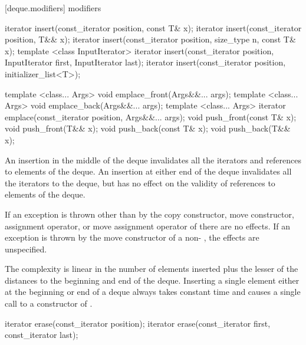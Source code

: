 [deque.modifiers]{ modifiers}

%
%
%
%
\begin{itemdecl}
iterator insert(const_iterator position, const T& x);
iterator insert(const_iterator position, T&& x);
iterator insert(const_iterator position, size_type n, const T& x);
template <class InputIterator>
  iterator insert(const_iterator position,
                  InputIterator first, InputIterator last);
iterator insert(const_iterator position, initializer_list<T>);

template <class... Args> void emplace_front(Args&&... args);
template <class... Args> void emplace_back(Args&&... args);
template <class... Args> iterator emplace(const_iterator position, Args&&... args);
void push_front(const T& x);
void push_front(T&& x);
void push_back(const T& x);
void push_back(T&& x);
\end{itemdecl}

\begin{itemdescr}
\pnum
\effects
An insertion in the middle of the deque invalidates all the iterators and
references to elements of the deque.
An insertion at either end of the
deque invalidates all the iterators to the deque, but has no effect on
the validity of references to elements of the deque.

\pnum
\notes
If an exception is thrown other than by the
copy constructor, move constructor,
assignment operator, or move assignment operator of
there are no effects.
If an exception is thrown by the move constructor of a
non-
, the effects are unspecified.

\pnum
\complexity
The complexity is linear in the number of elements inserted plus the lesser
of the distances to the beginning and end of the deque.
Inserting a single element either at the beginning or end of a deque always takes constant time
and causes a single call to a constructor of
.
\end{itemdescr}

%
\begin{itemdecl}
iterator erase(const_iterator position);
iterator erase(const_iterator first, const_iterator last);
\end{itemdecl}


